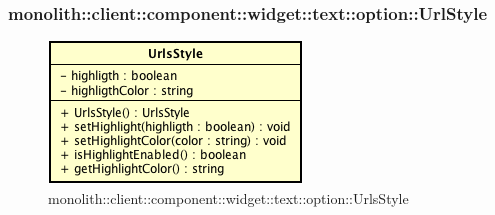 \subsubsection{monolith::client::component::widget::text::option::UrlStyle}

\label{monolith::client::component::widget::text::option::UrlsStyle}
\begin{figure}[H]
	\centering
	\includegraphics[scale=0.5]{Sezioni/SottosezioniST/img/UrlsStyle.png}
	\caption{monolith::client::component::widget::text::option::UrlsStyle}
\end{figure}

